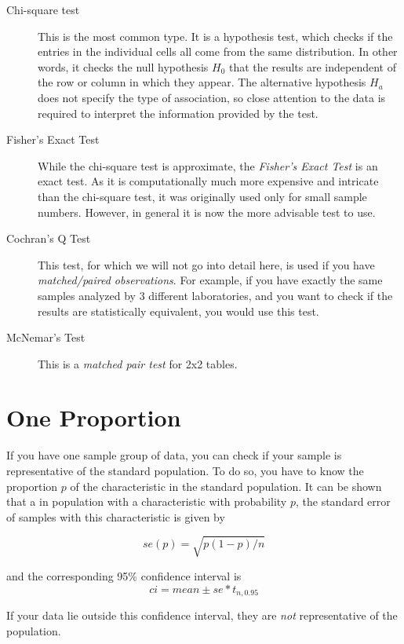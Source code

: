 \begin{description}
  \item[Chi-square test] This is the most common type. It is a hypothesis test, which checks if the entries in the individual cells all come from the same distribution. In other words, it checks the null hypothesis $H_0$ that the results are independent of the row or column in which they appear. The alternative hypothesis $H_a$ does not specify the type of association, so close attention to the data is required to interpret the information provided by the test.
  \item[Fisher's Exact Test] While the chi-square test is approximate, the \emph{Fisher's Exact Test} is an exact test. As it is computationally much more expensive and intricate than the chi-square test, it was originally used only for small sample numbers. However, in general it is now the more advisable test to use.
  \item[Cochran's Q Test]  This test, for which we will not go into detail here, is used if you have \emph{matched/paired observations}. For example, if you have exactly the same samples analyzed by 3 different laboratories, and you want to check if the results are statistically equivalent, you would use this test.
  \item[McNemar's Test]  This is a \emph{matched pair test }for 2x2 tables.
\end{description}


\section{One Proportion}

If you have one sample group of data, you can check if your sample is representative of the standard population. To do so, you have to know the proportion $p$ of the characteristic in the standard population. It can be shown that a in population with a characteristic with probability $p$, the standard error of samples with this characteristic is given by

\begin{equation}
  se(p) = \sqrt{p(1-p)/n}
\end{equation}

and the corresponding 95\% confidence interval is
\begin{equation*}
  ci = mean \pm se * t_{n,0.95}
\end{equation*}

If your data lie outside this confidence interval, they are \emph{not} representative of the population.

